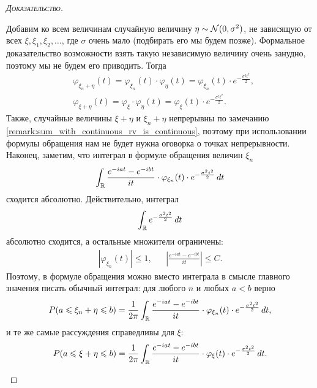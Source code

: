 \documentclass[../main.tex]{subfiles}
\begin{document}
\begin{proof}[\normalfont\textsc{Доказательство}]
\begin{itemize}
   Добавим ко всем величинам случайную величину $ \eta \sim \mathcal N(0,\sigma^{2}) $, не зависящую от всех $ \xi, \xi_1, \xi_2, \ldots $, где $ \sigma $ очень мало (подбирать его мы будем позже). Формальное доказательство возможности взять такую независимую величину очень занудно, поэтому мы не будем его приводить. Тогда
   \begin{align*}
    &\varphi_{\xi_n + \eta}(t) = \varphi_{\xi_n}(t) \cdot \varphi_\eta(t) = \varphi_{\xi_n}(t) \cdot e^{-\frac{\sigma^{2}t^{2}}{2}},\\
    &\varphi_{\xi+\eta}(t)=\varphi_{\xi}\cdot\varphi_\eta(t)=\varphi_\xi(t)\cdot e^{-\frac{\sigma^{2}t^{2}}{2}}
   .\end{align*} Также, случайные величины $ \xi + \eta $ и $ \xi_n + \eta $ непрерывны по замечанию \ref{remark:sum_with_continuous_rv_is_continuous}, поэтому при использовании формулы обращения нам не будет нужна оговорка о точках непрерывности. Наконец, заметим, что интеграл в формуле обращения величин $ \xi_n $
   \begin{align*}
    \int_{\mathbb{R}} \frac{e^{-iat}-e^{-ibt}}{it} \cdot \varphi_{\xi_n}(t) \cdot e^{-\frac{\sigma^{2}t^{2}}{2}}\,dt
   \end{align*} сходится абсолютно. Действительно, интеграл
   \begin{align*}
    \int_{\mathbb{R}} e^{-\frac{\sigma^{2}t^{2}}{2}}\,dt
   \end{align*} абсолютно сходится, а остальные множители ограничены:
   \begin{align*}
    \left| \varphi_{\xi_n}(t) \right| \leqslant 1, && \left| \frac{e^{-iat}-e^{-ibt}}{it} \right| \leqslant C.
   \end{align*} Поэтому, в формуле обращения можно вместо интеграла в смысле главного значения писать обычный интеграл: для любого $ n $ и любых $ a < b $ верно
   \begin{align*}
    P(a \leqslant \xi_n + \eta \leqslant b) = \frac{1}{2\pi} \int_{\mathbb{R}}   \frac{e^{-iat}-e^{-ibt}}{it} \cdot \varphi_{\xi_n}(t) \cdot e^{-\frac{\sigma^{2}t^{2}}{2}}\,dt,
   \end{align*} и те же самые рассуждения справедливы для $ \xi $:
   \begin{align*}
    P(a\leqslant\xi+\eta\leqslant b)=\frac{1}{2\pi}\int_\mathbb{R}\frac{e^{-iat}-e^{-ibt}}{it}\cdot\varphi_\xi(t)\cdot e^{-\frac{\sigma^{2}t^{2}}{2}}\,dt.
   \end{align*}


\end{itemize}
\end{proof}
\end{document}
